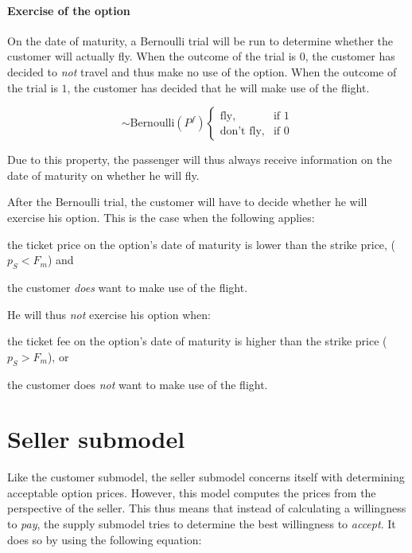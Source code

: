 \paragraph{Exercise of the option}
On the date of maturity, a Bernoulli trial will be run to determine whether the customer will actually fly. When the outcome of the trial is $0$, the customer has decided to \emph{not} travel and thus make no use of the option. When the outcome of the trial is $1$, the customer has decided that he will make use of the flight.

\begin{equation}
\sim \mbox{Bernoulli}(P^f)\begin{cases}
     \mbox{fly}, & \mbox{if } 1 \\
    \mbox{don't fly}, & \mbox{if } 0 \end{cases}
\end{equation}

Due to this property, the passenger will thus always receive information on the date of maturity on whether he will fly.

After the Bernoulli trial, the customer will have to decide whether he will exercise his option. This is the case when the following applies:
\begin{compactitem}
    \item the ticket price on the option's date of maturity is lower than the strike price, ($p_S < F_m$) and
    \item the customer \emph{does} want to make use of the flight.
\end{compactitem}

He will thus \emph{not} exercise his option when:
\begin{compactitem}
    \item the ticket fee on the option's date of maturity is higher than the strike price ($p_S > F_m$), or
    \item the customer does \emph{not} want to make use of the flight.
\end{compactitem}



\section{Seller submodel}
Like the customer submodel, the seller submodel concerns itself with determining acceptable option prices. However, this model computes the prices from the perspective of the seller. This thus means that instead of calculating a willingness to \emph{pay}, the supply submodel tries to determine the best willingness to \emph{accept}. It does so by using the following equation:


